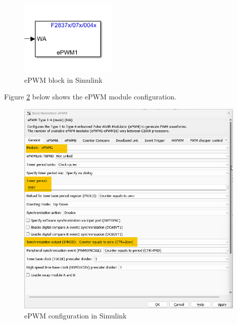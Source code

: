 \begin{figure}[H]
	\centering
	\includegraphics[width=1.8in]{sections/section6/images/SVPWM/ePWMBlock.png}
	\caption{ePWM block in Simulink}
	\label{fig:svpwm_block}
\end{figure}

Figure \ref{fig:ePWMTBPRD} below shows the ePWM module configuration.

\begin{figure}[H]
	\centering
	\includegraphics[width=4.3in]{sections/section6/images/SVPWM/ePWMTBPRD.png}
	\caption{ePWM configuration in Simulink}
	\label{fig:ePWMTBPRD}
\end{figure}

\newpage